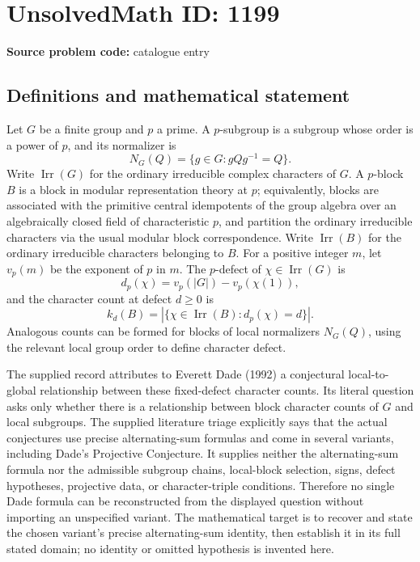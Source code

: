 \documentclass[11pt]{article}
\begin{document}
\section*{UnsolvedMath ID: 1199}
\textbf{Source problem code:} catalogue entry
\subsection{Definitions and mathematical statement}
Let $G$ be a finite group and $p$ a prime. A $p$-subgroup is a subgroup whose order is a power of $p$, and its normalizer is
\[
N_G(Q)=\{g\in G:gQg^{-1}=Q\}.
\]
Write $\operatorname{Irr}(G)$ for the ordinary irreducible complex characters of $G$. A $p$-block $B$ is a block in modular representation theory at $p$; equivalently, blocks are associated with the primitive central idempotents of the group algebra over an algebraically closed field of characteristic $p$, and partition the ordinary irreducible characters via the usual modular block correspondence. Write $\operatorname{Irr}(B)$ for the ordinary irreducible characters belonging to $B$. For a positive integer $m$, let $v_p(m)$ be the exponent of $p$ in $m$. The $p$-defect of $\chi\in\operatorname{Irr}(G)$ is
\[
d_p(\chi)=v_p(|G|)-v_p(\chi(1)),
\]
and the character count at defect $d\geq0$ is
\[
k_d(B)=|\{\chi\in\operatorname{Irr}(B):d_p(\chi)=d\}|.
\]
Analogous counts can be formed for blocks of local normalizers $N_G(Q)$, using the relevant local group order to define character defect.

The supplied record attributes to Everett Dade (1992) a conjectural local-to-global relationship between these fixed-defect character counts. Its literal question asks only whether there is a relationship between block character counts of $G$ and local subgroups. The supplied literature triage explicitly says that the actual conjectures use precise alternating-sum formulas and come in several variants, including Dade's Projective Conjecture. It supplies neither the alternating-sum formula nor the admissible subgroup chains, local-block selection, signs, defect hypotheses, projective data, or character-triple conditions. Therefore no single Dade formula can be reconstructed from the displayed question without importing an unspecified variant. The mathematical target is to recover and state the chosen variant's precise alternating-sum identity, then establish it in its full stated domain; no identity or omitted hypothesis is invented here.
\end{document}
